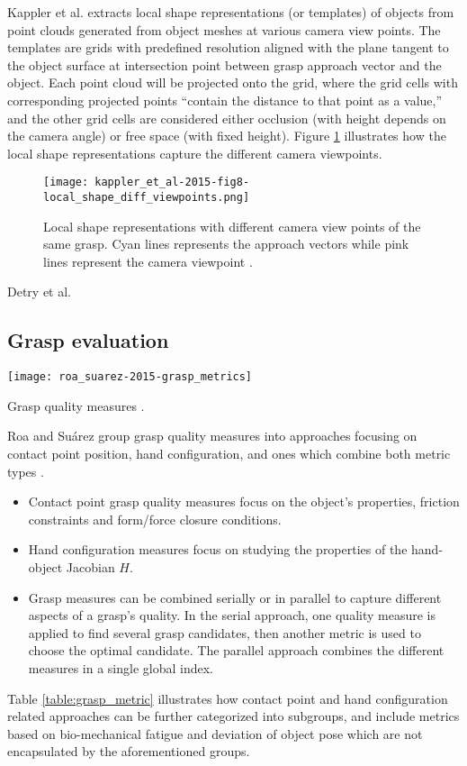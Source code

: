 Kappler et al. \cite{Kappler2015} extracts local shape representations (or templates) of objects from point clouds
generated from object meshes at various camera view points. The templates are grids with predefined resolution
aligned with the plane tangent to the object surface at intersection point between grasp approach vector and the
object. Each point cloud will be projected onto the grid, where the grid cells with corresponding projected points
``contain the distance to that point as a value,'' and the other grid cells are considered either occlusion
(with height depends on the camera angle) or free space (with fixed height). Figure \ref{fig:local_shape_viewpoints}
illustrates how the local shape representations capture the different camera viewpoints.

\begin{figure}[H]
    \centering
    \texttt{[image: kappler\_et\_al-2015-fig8-local\_shape\_diff\_viewpoints.png]}
    \caption{Local shape representations with different camera view points of the same grasp. Cyan lines
        represents the approach vectors while pink lines represent the camera viewpoint \cite{Kappler2015}.}
    \label{fig:local_shape_viewpoints}
\end{figure}

Detry et al. \cite{Detry2012} 

\subsection{Grasp evaluation}

\begin{table}[H]
    \texttt{[image: roa\_suarez-2015-grasp\_metrics]}
    \caption{Grasp quality measures \cite{Roa2015}.}
    \label{table:grasp_metric}
\end{table}

Roa and Su{\'a}rez group grasp quality measures into approaches focusing on contact point position, hand configuration, and ones which combine both metric types \cite{Roa2015}.
\begin{itemize}
    \item Contact point grasp quality measures focus on the object's properties, friction constraints and form/force closure conditions.
    \item Hand configuration measures focus on studying the properties of the hand-object Jacobian $H$.
    \item Grasp measures can be combined serially or in parallel to capture different aspects of a grasp's quality. In the serial approach, one quality measure is applied to find several grasp candidates, then another metric is used to choose the optimal candidate. The parallel approach combines the different measures in a single global index.
\end{itemize}
Table \ref{table:grasp_metric} illustrates how contact point and hand configuration related approaches can be further categorized into subgroups, and include metrics based on bio-mechanical fatigue and deviation of object pose which are not encapsulated by the aforementioned groups.

